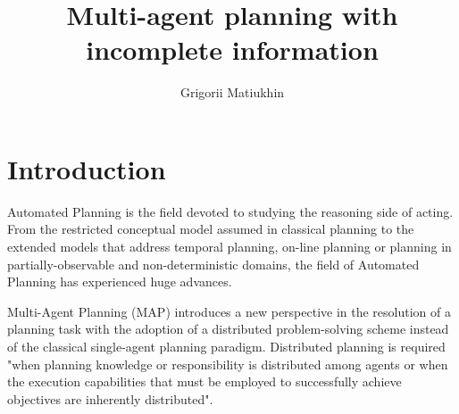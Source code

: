 \documentclass[12pt]{article}
\author{Grigorii Matiukhin}
\date{\DTMDisplaydate{2024}{3}{17}{-1}}
\title{Multi-agent planning with incomplete information}
\begin{document}
\maketitle
\thispagestyle{empty}

\newpage

\tableofcontents

\newpage
\section{Introduction}

Automated Planning is the field devoted to studying the reasoning side of acting.
From the restricted conceptual model assumed in classical planning to the extended models that address temporal planning, on-line planning or planning in partially-observable and non-deterministic domains, the field of Automated Planning has experienced huge advances\cite{ghallab2004automated}.

Multi-Agent Planning (MAP) introduces a new perspective in the resolution of a planning task with the adoption of a distributed problem-solving scheme instead of the classical single-agent planning paradigm.
Distributed planning is required "when planning knowledge or responsibility is distributed among agents or when the execution capabilities that must be employed to successfully achieve objectives are inherently distributed"\cite{desJardins1999ASO}.

\end{document}
